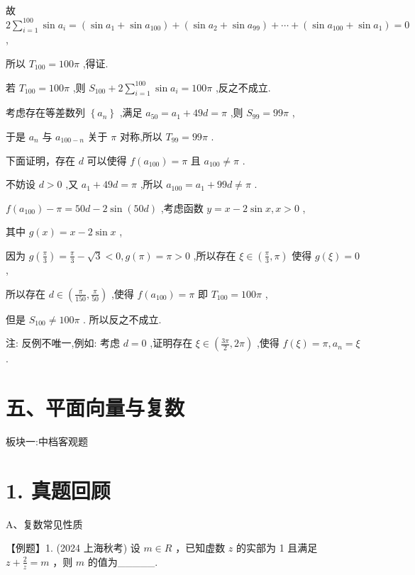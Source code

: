 \documentclass[10pt]{article}
\begin{document}
故 \(2\mathop{\sum }\limits_{{i = 1}}^{{100}}\sin {a}_{i} = \left( {\sin {a}_{1} + \sin {a}_{100}}\right)  + \left( {\sin {a}_{2} + \sin {a}_{99}}\right)  + \cdots  + \left( {\sin {a}_{100} + \sin {a}_{1}}\right)  = 0\) ,

所以 \({T}_{100} = {100\pi }\) ,得证.

若 \({T}_{100} = {100\pi }\) ,则 \({S}_{100} + 2\mathop{\sum }\limits_{{i = 1}}^{{100}}\sin {a}_{i} = {100\pi }\) ,反之不成立.

考虑存在等差数列 \(\left\{  {a}_{n}\right\}\) ,满足 \({a}_{50} = {a}_{1} + {49d} = \pi\) ,则 \({S}_{99} = {99\pi }\) ,

于是 \({a}_{n}\) 与 \({a}_{{100} - n}\) 关于 \(\pi\) 对称,所以 \({T}_{99} = {99\pi }\) .

下面证明，存在 \(d\) 可以使得 \(f\left( {a}_{100}\right)  = \pi\) 且 \({a}_{100} \neq  \pi\) .

不妨设 \(d > 0\) ,又 \({a}_{1} + {49d} = \pi\) ,所以 \({a}_{100} = {a}_{1} + {99d} \neq  \pi\) .

\(f\left( {a}_{100}\right)  - \pi  = {50d} - 2\sin \left( {50d}\right)\) ,考虑函数 \(y = x - 2\sin x,x > 0\) ,

其中 \(g\left( x\right)  = x - 2\sin x\) ,

因为 \(g\left( \frac{\pi }{3}\right)  = \frac{\pi }{3} - \sqrt{3} < 0,g\left( \pi \right)  = \pi  > 0\) ,所以存在 \(\xi  \in  \left( {\frac{\pi }{3},\pi }\right)\) 使得 \(g\left( \xi \right)  = 0\) ,

所以存在 \(d \in  \left( {\frac{\pi }{150},\frac{\pi }{50}}\right)\) ,使得 \(f\left( {a}_{100}\right)  = \pi\) 即 \({T}_{100} = {100\pi }\) ,

但是 \({S}_{100} \neq  {100\pi }\) . 所以反之不成立.

注: 反例不唯一,例如: 考虑 \(d = 0\) ,证明存在 \(\xi  \in  \left( {\frac{3\pi }{2},{2\pi }}\right)\) ,使得 \(f\left( \xi \right)  = \pi ,{a}_{n} = \xi\) .

\section*{五、平面向量与复数}

板块一:中档客观题

\section*{1. 真题回顾}

A、复数常见性质

【例题】1. (2024 上海秋考) 设 \(m \in  R\) ，已知虚数 \(z\) 的实部为 1 且满足 \(z + \frac{2}{z} = m\) ，则 \(m\) 的值为\_\_\_\_\_.
\end{document}
